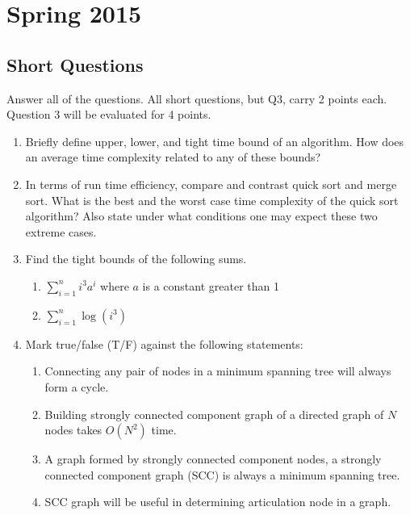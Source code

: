 \section{Spring 2015}

\subsection{Short Questions}

Answer all of the questions.  All short questions, but Q3, carry 2 points each.  Question 3 will be evaluated for 4 points.

\begin{enumerate}
	\item Briefly define upper, lower, and tight time bound of an algorithm.  How does an average time complexity related to any of these bounds?
	
	\item In terms of run time efficiency, compare and contrast quick sort and merge sort.  What is the best and the worst case time complexity of the quick sort algorithm?  Also state under what conditions one may expect these two extreme cases.
	
	\item Find the tight bounds of the following sums.  
	\begin{enumerate}
		\item $\displaystyle \sum_{i=1}^n i^3 a^i$ where $a$ is a constant greater than 1
		\item $\displaystyle \sum_{i=1}^n \log (i^3)$ 
	\end{enumerate}
	
	\item Mark true/false (T/F) against the following statements:
	\begin{enumerate}
		\item Connecting any pair of nodes in a minimum spanning tree will always form a cycle.
		\item Building strongly connected component graph of a directed graph of $N$ nodes takes $O(N^2)$ time.  
		\item A graph formed by strongly connected component nodes, a strongly connected component graph (SCC) is always a minimum spanning tree.
		\item SCC graph will be useful in determining articulation node in a graph.
	\end{enumerate}
	

\end{enumerate}
